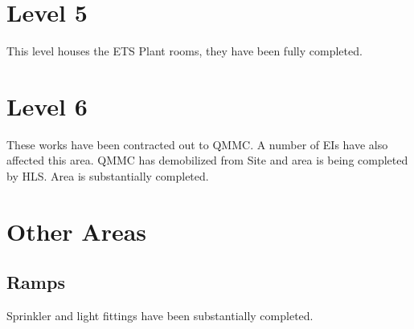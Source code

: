 \section{Level 5}

This level houses the ETS Plant rooms, they have been fully completed.

\section{Level 6}

These works have been contracted out to QMMC. A number of EIs have also affected this area. QMMC has demobilized from Site and area is being completed by HLS. Area is substantially completed.

\section{Other Areas}

\subsection{Ramps}

Sprinkler and light fittings have been substantially completed.







